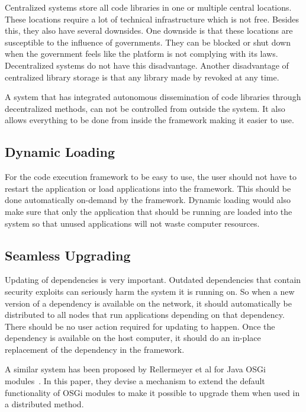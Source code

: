 Centralized systems store all code libraries in one or multiple central locations. These locations require a lot of technical infrastructure which is not free. Besides this, they also have several downsides. One downside is that these locations are susceptible to the influence of governments. They can be blocked or shut down when the government feels like the platform is not complying with its laws. Decentralized systems do not have this disadvantage. Another disadvantage of centralized library storage is that any library made by revoked at any time.

A system that has integrated autonomous dissemination of code libraries through decentralized methods, can not be controlled from outside the system. It also allows everything to be done from inside the framework making it easier to use.

\subsection*{Dynamic Loading}

For the code execution framework to be easy to use, the user should not have to restart the application or load applications into the framework. This should be done automatically on-demand by the framework. Dynamic loading would also make sure that only the application that should be running are loaded into the system so that unused applications will not waste computer resources.


\subsection*{Seamless Upgrading}

Updating of dependencies is very important. Outdated dependencies that contain security exploits can seriously harm the system it is running on. So when a new version of a dependency is available on the network, it should automatically be distributed to all nodes that run applications depending on that dependency. There should be no user action required for updating to happen. Once the dependency is available on the host computer, it should do an in-place replacement of the dependency in the framework.

A similar system has been proposed by Rellermeyer et al for Java OSGi modules~\cite{rellermeyer2008consistently}. In this paper, they devise a mechanism to extend the default functionality of OSGi modules to make it possible to upgrade them when used in a distributed method.

